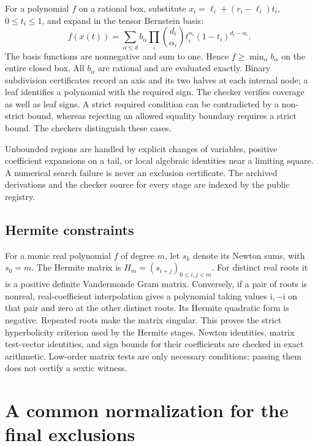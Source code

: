 \documentclass[11pt]{article}
\theoremstyle{definition}
\begin{document}
For a polynomial $f$ on a rational box, substitute
$x_i=\ell_i+(r_i-\ell_i)t_i$, $0\le t_i\le1$, and expand in the tensor
Bernstein basis:
\begin{equation}\label{eq:bernstein}
 f(x(t))=\sum_{\alpha\le d} b_\alpha
   \prod_i\binom{d_i}{\alpha_i}t_i^{\alpha_i}(1-t_i)^{d_i-\alpha_i}.
\end{equation}
The basis functions are nonnegative and sum to one. Hence
$f\ge\min_\alpha b_\alpha$ on the entire closed box. All $b_\alpha$ are
rational and are evaluated exactly. Binary subdivision certificates
record an axis and its two halves at each internal node; a leaf identifies
a polynomial with the required sign. The checker verifies coverage as
well as leaf signs. A strict required condition can be contradicted by a
non-strict bound, whereas rejecting an allowed equality boundary requires
a strict bound. The checkers distinguish these cases.

Unbounded regions are handled by explicit changes of variables, positive
coefficient expansions on a tail, or local algebraic identities near a
limiting square. A numerical search failure is never an exclusion
certificate. The archived derivations and the checker source for every
stage are indexed by the public registry.

\subsection{Hermite constraints}
For a monic real polynomial $f$ of degree $m$, let $s_k$ denote its Newton
sums, with $s_0=m$. The Hermite matrix is $H_m=(s_{i+j})_{0\le i,j<m}$.
For distinct real roots it is a positive definite Vandermonde Gram matrix.
Conversely, if a pair of roots is nonreal, real-coefficient interpolation
gives a polynomial taking values $\mathrm i,-\mathrm i$ on that pair and
zero at the other distinct roots. Its Hermite quadratic form is negative.
Repeated roots make the matrix singular. This proves the strict
hyperbolicity criterion used by the Hermite stages. Newton identities,
matrix test-vector identities, and sign bounds for their coefficients are
checked in exact arithmetic. Low-order matrix tests are only necessary
conditions; passing them does not certify a sextic witness.

\section{A common normalization for the final exclusions}\label{sec:normal}
\end{document}
